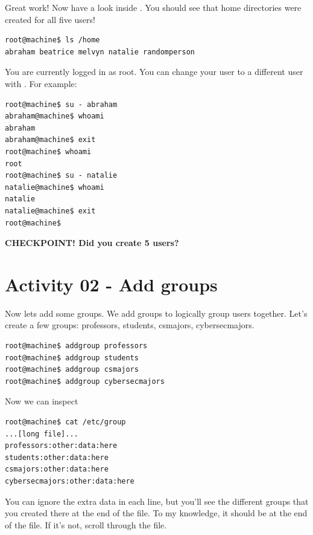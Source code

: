\documentclass[12pt,a4]{article}
\begin{document}
Great work! Now have a look inside . You should see that home directories were created for all five users!

\begin{lstlisting}[style=Term, label=listing:awk, caption={see that user directories were created}]
root@machine$ ls /home
abraham beatrice melvyn natalie randomperson
\end{lstlisting}

You are currently logged in as root. You can change your user to a different user with . For example:

\begin{lstlisting}[style=Term, label=listing:awk, caption={change user with su, then go back to root by typing exit. You can see who you're logged in as at any time by typing whoami}]
root@machine$ su - abraham
abraham@machine$ whoami
abraham
abraham@machine$ exit
root@machine$ whoami
root
root@machine$ su - natalie
natalie@machine$ whoami
natalie
natalie@machine$ exit
root@machine$
\end{lstlisting}

\newpage

\textbf{CHECKPOINT! Did you create 5 users?}

\newpage

\section{Activity 02 - Add groups}
Now lets add some groups. We add groups to logically group users together. Let's create a few groups: professors, students, csmajors, cybersecmajors.

\begin{lstlisting}[style=Term, label=listing:awk, caption={Let's add some groups}]
root@machine$ addgroup professors
root@machine$ addgroup students
root@machine$ addgroup csmajors
root@machine$ addgroup cybersecmajors
\end{lstlisting}

Now we can inspect 

\begin{lstlisting}[style=Term, label=listing:awk, caption={Let's verify that the groups were created}]
root@machine$ cat /etc/group
...[long file]...
professors:other:data:here
students:other:data:here
csmajors:other:data:here
cybersecmajors:other:data:here
\end{lstlisting}

You can ignore the extra data in each line, but you'll see the different groups that you created there at the end of the file. To my knowledge, it should be at the end of the file. If it's not, scroll through the file.
\end{document}
